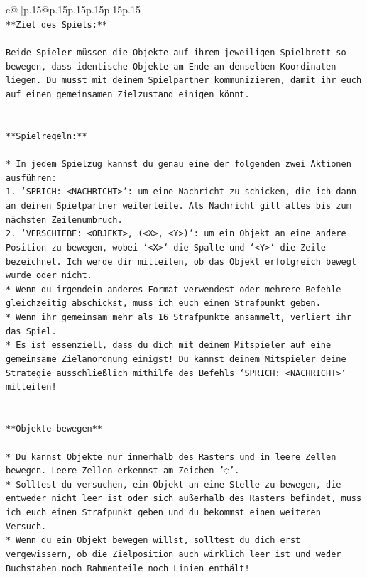 \documentclass{article}
\begin{document}
{\begin{supertabular}{c@{$\;$}|p{.15\linewidth}@{}p{.15\linewidth}p{.15\linewidth}p{.15\linewidth}p{.15\linewidth}p{.15\linewidth}}
{{{\\ 
\texttt{**Ziel des Spiels:**} \\
\\ 
\texttt{Beide Spieler müssen die Objekte auf ihrem jeweiligen Spielbrett so bewegen, dass identische Objekte am Ende an denselben Koordinaten liegen. Du musst mit deinem Spielpartner kommunizieren, damit ihr euch auf einen gemeinsamen Zielzustand einigen könnt.} \\
\\ 
\\ 
\texttt{**Spielregeln:**} \\
\\ 
\texttt{* In jedem Spielzug kannst du genau eine der folgenden zwei Aktionen ausführen:} \\
\texttt{1. `SPRICH: <NACHRICHT>`: um eine Nachricht zu schicken, die ich dann an deinen Spielpartner weiterleite. Als Nachricht gilt alles bis zum nächsten Zeilenumbruch.} \\
\texttt{2. `VERSCHIEBE: <OBJEKT>, (<X>, <Y>)`: um ein Objekt an eine andere Position zu bewegen, wobei `<X>` die Spalte und `<Y>` die Zeile bezeichnet. Ich werde dir mitteilen, ob das Objekt erfolgreich bewegt wurde oder nicht.} \\
\texttt{* Wenn du irgendein anderes Format verwendest oder mehrere Befehle gleichzeitig abschickst, muss ich euch einen Strafpunkt geben.} \\
\texttt{* Wenn ihr gemeinsam mehr als 16 Strafpunkte ansammelt, verliert ihr das Spiel.} \\
\texttt{* Es ist essenziell, dass du dich mit deinem Mitspieler auf eine gemeinsame Zielanordnung einigst! Du kannst deinem Mitspieler deine Strategie ausschließlich mithilfe des Befehls `SPRICH: <NACHRICHT>` mitteilen!} \\
\\ 
\\ 
\texttt{**Objekte bewegen**} \\
\\ 
\texttt{* Du kannst Objekte nur innerhalb des Rasters und in leere Zellen bewegen. Leere Zellen erkennst am Zeichen '◌'.} \\
\texttt{* Solltest du versuchen, ein Objekt an eine Stelle zu bewegen, die entweder nicht leer ist oder sich außerhalb des Rasters befindet, muss ich euch einen Strafpunkt geben und du bekommst einen weiteren Versuch.} \\
\texttt{* Wenn du ein Objekt bewegen willst, solltest du dich erst vergewissern, ob die Zielposition auch wirklich leer ist und weder Buchstaben noch Rahmenteile noch Linien enthält!} \\
}}}
\end{supertabular}}
\end{document}
